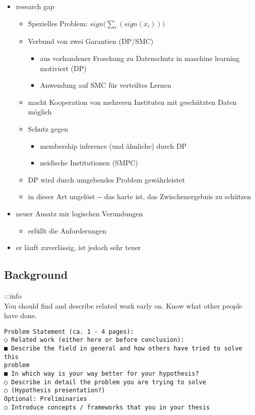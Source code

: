 \documentclass[
]{article}
\begin{document}
\begin{itemize}
\item
  research gap

  \begin{itemize}
  \item
    Spezielles Problem: \(sign\big(\sum_i(sign{(x_i)})\big)\)
  \item
    Verbund von zwei Garantien (DP/SMC)

    \begin{itemize}
    \item
      aus vorhandener Froschung zu Datenschutz in maschine learning
      motiviert (DP)
    \item
      Anwendung auf SMC für verteiltes Lernen
    \end{itemize}
  \item
    macht Kooperation von mehreren Instituten mit geschützten Daten
    möglich
  \item
    Schutz gegen

    \begin{itemize}
    \item
      membership inference (und ähnliche) durch DP
    \item
      neidische Institutionen (SMPC)
    \end{itemize}
  \item
    DP wird durch umgebendes Problem gewährleistet
  \item
    in dieser Art ungelöst -\/- das harte ist, das Zwischenergebnis zu
    schützen
  \end{itemize}
\item
  neuer Ansatz mir logischen Verundungen

  \begin{itemize}
  \item
    erfüllt die Anforderungen
  \end{itemize}
\item
  er läuft zuverlässig, ist jedoch sehr teuer
\end{itemize}

\hypertarget{header-n42}{%
\subsection{Background}\label{header-n42}}

:::info\\
You should find and describe related work early on. Know what other
people have done.

\begin{verbatim}
Problem Statement (ca. 1 - 4 pages):
○ Related work (either here or before conclusion):
■ Describe the field in general and how others have tried to solve this
problem
■ In which way is your way better for your hypothesis?
○ Describe in detail the problem you are trying to solve
○ (Hypothesis presentation?)
Optional: Preliminaries
○ Introduce concepts / frameworks that you in your thesis
\end{verbatim}
\end{document}
